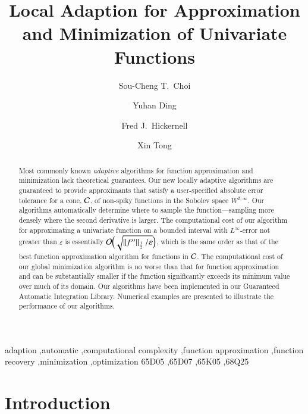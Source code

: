 \documentclass[review]{elsarticle}
\newcommand{\abstol}{\varepsilon}
\theoremstyle{definition}
\renewcommand{\cw}{W}
\begin{document}
\begin{frontmatter}

\title{Local Adaption for Approximation and Minimization of Univariate Functions}


\author{Sou-Cheng T.~Choi}
\author{Yuhan Ding}
\author{Fred J.~Hickernell}
\address{Department of Applied Mathematics, Illinois Institute of Technology, RE 208, 10 West 32$^{\text{nd}}$ Street, Chicago, Illinois, 60616, USA}
\author{Xin Tong}
\address{Department of Mathematics, Statistics, and Computer Science, University of Illinois at Chicago, Room 322 SEO, 851 S. Morgan Street, Chicago, Illinois, 60607, USA}



\begin{abstract}
Most commonly known \emph{adaptive} algorithms for function approximation and
minimization lack theoretical guarantees. Our new locally adaptive algorithms
are guaranteed to provide approximants that satisfy a user-specified absolute
error tolerance for a cone, $\mathcal{C}$, of non-spiky functions in the Sobolev space
$\cw^{2,\infty}$. Our algorithms automatically determine where to sample the
function---sampling more densely where the second derivative is larger. The
computational cost of our algorithm for approximating a univariate function on a
bounded interval with $L^{\infty}$-error not greater than $\abstol$ is
essentially $\Order\Bigl(\sqrt{\norm[\frac12]{f''}/\abstol}\Bigr)$, which is the
same order as that of the best function approximation algorithm for functions in
$\mathcal{C}$. The computational cost of our global minimization algorithm is no worse
than that for function approximation and can be substantially smaller if the
function significantly exceeds its minimum value over much of its domain. Our
algorithms have been implemented in our Guaranteed Automatic Integration
Library. Numerical examples are presented to illustrate the performance of our
algorithms.
\end{abstract}

\begin{keyword}
adaption \sep automatic \sep computational complexity \sep function approximation \sep function recovery \sep minimization \sep optimization
\MSC[2010]  65D05 \sep 65D07 \sep 65K05 \sep 68Q25
\end{keyword}

\end{frontmatter}

\section{Introduction} \label{sec:intro}
\end{document}
